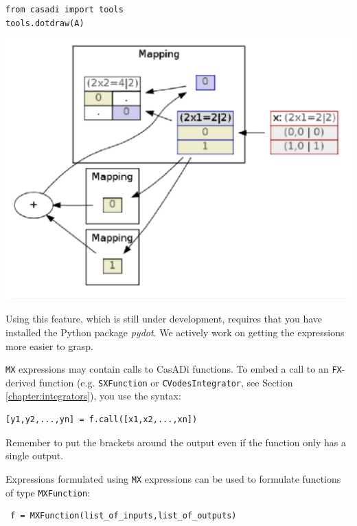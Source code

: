 \documentclass[a4paper,12pt]{book}
\begin{document}
{\begin{minipage}[t]{0.45\textwidth}
\texttt{from casadi import tools} \\
\texttt{tools.dotdraw(A)} \\
\end{minipage}
\begin{minipage}[t]{0.45\textwidth}
\begin{center}
\includegraphics[width=\textwidth]{mxdraw}
\end{center}
\end{minipage}

Using this feature, which is still under development, requires that you have installed the Python package \emph{pydot}. We actively work on getting the expressions more easier to grasp.

\texttt{MX} expressions may contain calls to CasADi functions. To embed a call to an \texttt{FX}-derived function (e.g. \texttt{SXFunction} or \texttt{CVodesIntegrator}, see Section \ref{chapter:integrators}), you use the syntax:
\begin{verbatim}
[y1,y2,...,yn] = f.call([x1,x2,...,xn])
\end{verbatim}

Remember to put the brackets around the output even if the function only has a single output.

Expressions formulated using \texttt{MX} expressions can be used to formulate functions of type \texttt{MXFunction}:
\begin{verbatim}
 f = MXFunction(list_of_inputs,list_of_outputs)
\end{verbatim}

}
\end{document}
